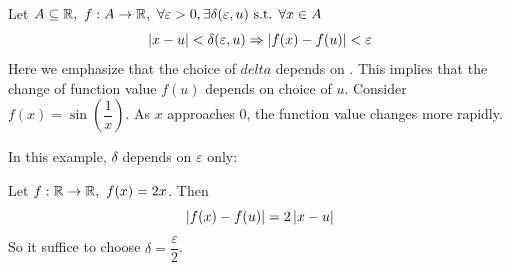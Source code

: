 \documentclass[a4paper,12pt]{article}
\begin{document}
Let \(A\subseteq\R,\ f:A\rightarrow\R,\ \forall \varepsilon>0, \exists\delta(\varepsilon, u)\st \forall x\in A\)
\[\left\lvert x-u\right\rvert<\delta(\varepsilon, u)\Rightarrow \left\lvert f(x)-f(u)\right\rvert<\varepsilon\]
Here we emphasize that the choice of \(delta\) depends on . 
This implies that the change of function value \(f(u)\) depends on choice of \(u\). 
Consider \(f(x)=\sin(\dfrac{1}{x})\). As \(x\) approaches 0, the function value changes more rapidly.\\

\begin{example}
    In this example, \(\delta\) depends on \(\varepsilon\) only:

    Let \(f:\mathbb{R}\rightarrow\mathbb{R},\ f(x)=2x\). Then 
    \[\left\lvert f(x)-f(u)\right\rvert=2\left\lvert x-u\right\rvert\]
    So it suffice to choose \(\delta=\dfrac{\varepsilon}{2}\).
\end{example}
\end{document}
